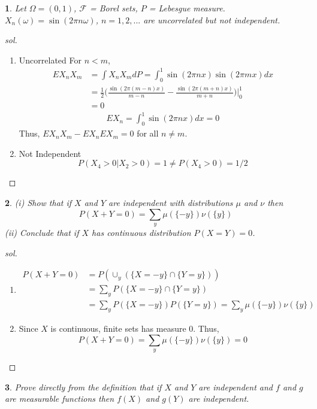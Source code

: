 \documentclass{report}
\newtheorem{ex}{}[section]
\begin{document}
\begin{ex}
Let $\Omega = (0, 1)$, $\mathcal{F}$ = Borel sets, $P$ = Lebesgue measure. $X_n(\omega) = \sin(2\pi n\omega)$, $n = 1, 2,...$ are uncorrelated but not independent.
\end{ex}
\begin{proof}[sol]~
\begin{enumerate}
    \item Uncorrelated
    For $n < m$,
    \begin{align*}
        E X_nX_m &= \int X_nX_mdP = \int_0^1 \sin(2\pi nx) \sin(2\pi mx)dx\\
        &= \frac{1}{2}\bigg(\frac{\sin(2\pi(m-n)x)}{m-n} - \frac{\sin(2\pi(m+n)x)}{m+n}\bigg)\bigg|_0^1\\
        &= 0
    \end{align*}
    \begin{align*}
        EX_n = \int_0^1 \sin(2\pi nx)dx = 0
    \end{align*}
    Thus, $EX_nX_m - EX_nEX_m = 0$ for all $n \ne m$.
    \item Not Independent
        \[P(X_4 > 0 |X_2 > 0) = 1 \ne P(X_4 > 0) = 1/2\]
\end{enumerate}

\end{proof}
\begin{ex}
(i) Show that if $X$ and $Y$ are independent with distributions $\mu$ and $\nu$ then
\[P(X + Y = 0) = \sum_y \mu(\{ -y\})\nu(\{y\})\]
(ii) Conclude that if $X$ has continuous distribution $P(X = Y ) = 0$.
\end{ex}
\begin{proof}[sol]~
\begin{enumerate}
    \item[(i)]
    \begin{align*}
        P(X+Y = 0) &= P(\cup_y (\{X = -y\}\cap\{Y = y\}))\\
        &= \sum_y P(\{X = -y\}\cap\{Y = y\})\\
        &= \sum_y P(\{X = -y\})P(\{Y = y\}) = \sum_y \mu(\{ -y\})\nu(\{y\})
    \end{align*}
    \item[(ii)]
    Since $X$ is continuous, finite sets has measure 0. Thus,
    \[P(X + Y = 0) = \sum_y \mu(\{ -y\})\nu(\{y\}) = 0\]
\end{enumerate}
\end{proof}
\begin{ex}
Prove directly from the definition that if $X$ and $Y$ are independent and $f$ and $g$ are measurable functions then $f(X)$ and $g(Y)$ are independent.
\end{ex}
\end{document}
